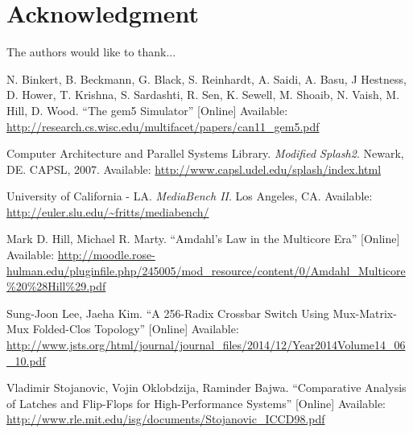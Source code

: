 \documentclass[journal]{IEEEtran}
\begin{document}

\section*{Acknowledgment}
The authors would like to thank...

\begin{thebibliography}{1}
    N. Binkert, B. Beckmann, G. Black, S. Reinhardt, A. Saidi, A. Basu, J Hestness, D. Hower, T. Krishna, S. Sardashti, R. Sen, K. Sewell, M. Shoaib, N. Vaish, M. Hill, D. Wood. ``The gem5 Simulator'' [Online]
    Available: \url{http://research.cs.wisc.edu/multifacet/papers/can11_gem5.pdf}

    Computer Architecture and Parallel Systems Library. \textit{Modified Splash2}. Newark, DE. CAPSL, 2007.
    Available: \url{http://www.capsl.udel.edu/splash/index.html}

    University of California - LA. \textit{MediaBench II}. Los Angeles, CA.
    Available: \url{http://euler.slu.edu/~fritts/mediabench/}

    Mark D. Hill, Michael R. Marty. ``Amdahl’s Law in the Multicore Era'' [Online]
    Available: \url{http://moodle.rose-hulman.edu/pluginfile.php/245005/mod_resource/content/0/Amdahl_Multicore%20%28Hill%29.pdf}

    Sung-Joon Lee, Jaeha Kim. ``A 256-Radix Crossbar Switch Using Mux-Matrix-Mux Folded-Clos Topology'' [Online]
    Available: \url{http://www.jsts.org/html/journal/journal_files/2014/12/Year2014Volume14_06_10.pdf}

    Vladimir Stojanovic, Vojin Oklobdzija, Raminder Bajwa. ``Comparative Analysis of Latches and Flip-Flops for High-Performance Systems'' [Online]
    Available: \url{http://www.rle.mit.edu/isg/documents/Stojanovic_ICCD98.pdf}
\end{thebibliography}

\end{document}
